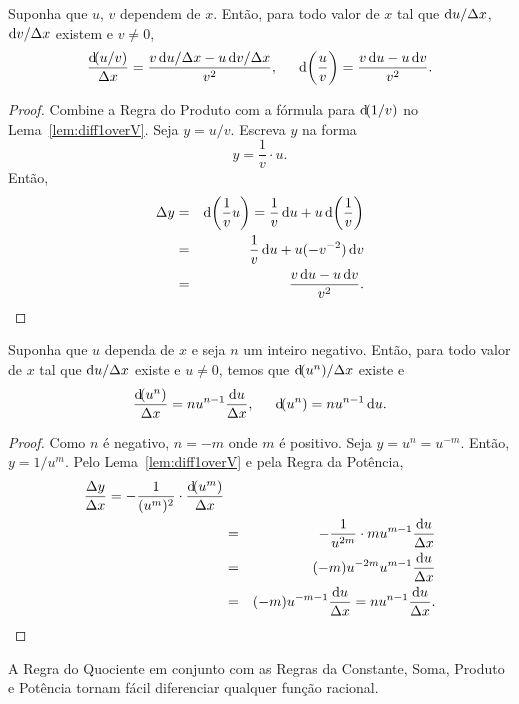 \begin{theorem}
Suponha que $u$, $v$ dependem de $x$. Então, para todo valor de $x$ tal
que $\du/\dx$, $\dv/\dx$ existem e $v \ne 0$,
$$
  \frac{\dif(u/v)}{\dx} = \frac{v \du/\dx - u \dv/\dx}{v^2},
  \hspace{1.5em}
  \dif\left(\frac{u}{v}\right) = \frac{v \du - u \dv}{v^2}.
$$
\end{theorem}

\begin{proof} Combine a Regra do Produto com a fórmula para $\dif(1/v)$
no Lema~\ref{lem:diff1overV}. Seja $y = u/v$. Escreva $y$ na forma
$$
  y = \frac{1}{v} \cdot u.
$$
Então,
\begin{eqnarray*}
  \dy & = & \dif\left(\frac{1}{v} u\right) =
    \frac{1}{v} \du + u \dif\left( \frac{1}{v} \right) \\
  & = & \frac{1}{v} \du + u (-v^{-2}) \dv \\
  & = & \frac{v \du - u \dv}{v^2}.
\end{eqnarray*}
\end{proof}

\begin{theorem}
Suponha que $u$ dependa de $x$ e seja $n$ um inteiro negativo. Então, para
todo valor de $x$ tal que $\du/\dx$ existe e $u \ne 0$, temos que
$\dif(u^n)/\dx$ existe e
$$
  \frac{\dif(u^n)}{\dx} = n u^{n-1} \frac{\du}{\dx},
  \hspace{1.5em}
  \dif(u^n) = n u^{n-1} \du.
$$
\end{theorem}

\begin{proof} Como $n$ é negativo, $n = -m$ onde $m$ é positivo. Seja
$y = u^n = u^{-m}$. Então, $y = 1/u^m$. Pelo Lema~\ref{lem:diff1overV}
e pela Regra da Potência,
\begin{eqnarray*}
 \frac{\dy}{\dx} = -\frac{1}{(u^m)^2} \cdot \frac{\dif(u^m)}{\dx} \\
 & = & -\frac{1}{u^{2m}} \cdot m u^{m-1} \frac{\du}{\dx} \\
 & = & (-m) u^{-2m} u^{m-1} \frac{\du}{\dx} \\
 & = & (-m) u^{-m-1} \frac{\du}{\dx} = n u^{n-1} \frac{\du}{\dx}.
\end{eqnarray*}
\end{proof}

A Regra do Quociente em conjunto com as Regras da Constante, Soma, Produto e
Potência tornam fácil diferenciar qualquer função racional.

